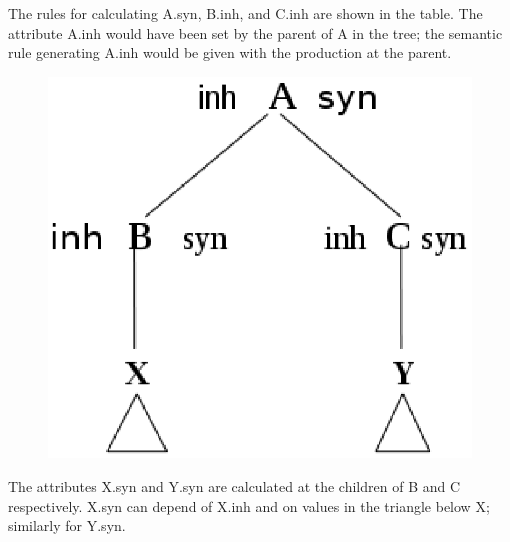 \documentclass[a4paper,12pt]{article}
\begin{document}
The rules for calculating A.syn, B.inh, and C.inh are shown in the table. The attribute A.inh would have been set by the parent of A in the tree; the semantic rule generating A.inh would be given with the production at the parent.
\begin{figure}[!bhp]
\centering
\includegraphics[scale=0.4]{q5}
\end{figure}
The attributes X.syn and Y.syn are calculated at the children of B and C respectively. X.syn can depend of X.inh and on values in the triangle below X; similarly for Y.syn.
\end{document}
